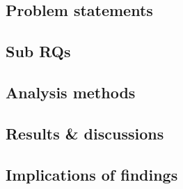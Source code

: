 \subsection{Problem statements}

\subsection{Sub RQs}

\subsection{Analysis methods}

\subsection{Results \& discussions}

\subsection{Implications of findings}